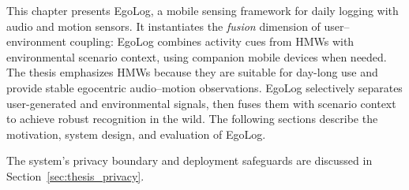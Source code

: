 This chapter presents EgoLog, a mobile sensing framework for daily logging with audio and motion sensors. It instantiates the \textit{fusion} dimension of user--environment coupling: EgoLog combines activity cues from HMWs with environmental scenario context, using companion mobile devices when needed. The thesis emphasizes HMWs because they are suitable for day-long use and provide stable egocentric audio--motion observations. EgoLog selectively separates user-generated and environmental signals, then fuses them with scenario context to achieve robust recognition in the wild.
The following sections describe the motivation, system design, and evaluation of EgoLog.


% 




The system's privacy boundary and deployment safeguards are discussed in Section~\ref{sec:thesis_privacy}.
